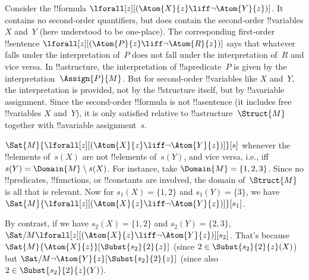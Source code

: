 \documentclass[../../../include/open-logic-section]{subfiles}
\begin{document}
\begin{ex}
  Consider the !!{formula} $\lforall[z][(\Atom{X}{z} \liff \lnot
    \Atom{Y}{z})]$. It contains no second-order quantifiers, but does
  contain the second-order !!{variable}s $X$ and~$Y$ (here understood to
  be one-place). The corresponding first-order !!{sentence}
  $\lforall[z][(\Atom{P}{z} \liff \lnot \Atom{R}{z})]$ says that
  whatever falls under the interpretation of~$P$ does not fall under
  the interpretation of~$R$ and vice versa. In !!a{structure}, the
  interpretation of !!a{predicate}~$P$ is given by the
  interpretation~$\Assign{P}{M}$. But for second-order !!{variable}s
  like $X$ and~$Y$, the interpretation is provided, not by the
  !!{structure} itself, but by !!a{variable} assignment. Since the
  second-order !!{formula} is not !!a{sentence} (it includes free
  !!{variable}s $X$ and~$Y$), it is only satisfied relative to
  !!a{structure}~$\Struct{M}$ together with !!a{variable}
  assignment~$s$.

  $\Sat{M}{\lforall[z][(\Atom{X}{z} \liff \lnot \Atom{Y}{z})]}[s]$
  whenever the !!{element}s of~$s(X)$ are not !!{element}s of~$s(Y)$,
  and vice versa, i.e., iff $s(Y) = \Domain{M} \setminus s(X)$. For
  instance, take $\Domain{M} = \{1, 2, 3\}$. Since no !!{predicate}s,
  !!{function}s, or !!{constant}s are involved, the domain
  of~$\Struct{M}$ is all that is relevant. Now for $s_1(X) = \{1, 2\}$
  and $s_1(Y) = \{3\}$, we have $\Sat{M}{\lforall[z][(\Atom{X}{z}
      \liff \lnot \Atom{Y}{z})]}[s_1]$.

  By contrast, if we have $s_2(X) = \{1, 2\}$ and $s_2(Y) = \{2, 3\}$,
  $\Sat/{M}{\lforall[z][(\Atom{X}{z} \liff \lnot
      \Atom{Y}{z})]}[s_2]$. That's because 
  $\Sat{M}{\Atom{X}{z}}[\Subst{s_2}{2}{z}]$ (since $2 \in \Subst{s_2}{2}{z}(X)$) but
  $\Sat/{M}{\lnot \Atom{Y}{z}}[\Subst{s_2}{2}{z}]$ (since also $2 \in
  \Subst{s_2}{2}{z}(Y)$).
\end{ex}
\end{document}
